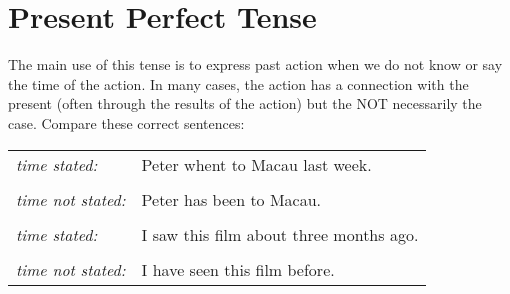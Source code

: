 \section{Present Perfect Tense}
The main use of this tense is to express past action when we do not know or say
the time of the action.
In many cases, the action has a connection with the present (often through the
results of the action) but the NOT necessarily the case.
Compare these correct sentences: \newline
\begin{tabular}{ll}
    \it{time stated:} & Peter whent to Macau last week. \\ & \\
    \it{time not stated:} & Peter has been to Macau. \\ & \\
    \it{time stated:} & I saw this film about three months ago. \\ & \\
    \it{time not stated:} & I have seen this film before.
\end{tabular}
